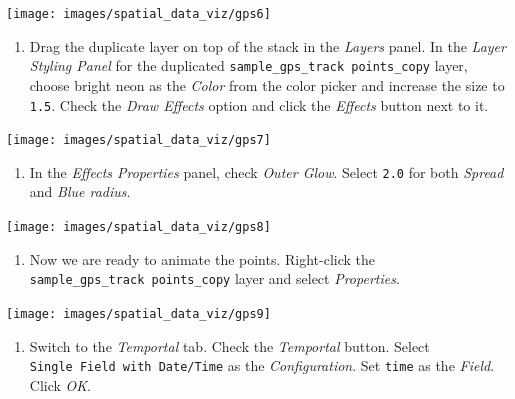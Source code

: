 \documentclass[
  12pt,
  a4paper]{article}
\providecommand{\tightlist}{%
  \setlength{\itemsep}{0pt}\setlength{\parskip}{0pt}}
\begin{document}
\begin{center}\texttt{[image: images/spatial\_data\_viz/gps6]} \end{center}

\begin{enumerate}
\def\labelenumi{\arabic{enumi}.}
\setcounter{enumi}{6}
\tightlist
\item
  Drag the duplicate layer on top of the stack in the \emph{Layers}
  panel. In the \emph{Layer Styling Panel} for the duplicated
  \texttt{sample\_gps\_track\ points\_copy} layer, choose bright neon as
  the \emph{Color} from the color picker and increase the size to
  \texttt{1.5}. Check the \emph{Draw Effects} option and click the
  \emph{Effects} button next to it.
\end{enumerate}

\begin{center}\texttt{[image: images/spatial\_data\_viz/gps7]} \end{center}

\begin{enumerate}
\def\labelenumi{\arabic{enumi}.}
\setcounter{enumi}{7}
\tightlist
\item
  In the \emph{Effects Properties} panel, check \emph{Outer Glow}.
  Select \texttt{2.0} for both \emph{Spread} and \emph{Blue radius}.
\end{enumerate}

\begin{center}\texttt{[image: images/spatial\_data\_viz/gps8]} \end{center}

\begin{enumerate}
\def\labelenumi{\arabic{enumi}.}
\setcounter{enumi}{8}
\tightlist
\item
  Now we are ready to animate the points. Right-click the
  \texttt{sample\_gps\_track\ points\_copy} layer and select
  \emph{Properties}.
\end{enumerate}

\begin{center}\texttt{[image: images/spatial\_data\_viz/gps9]} \end{center}

\begin{enumerate}
\def\labelenumi{\arabic{enumi}.}
\setcounter{enumi}{9}
\tightlist
\item
  Switch to the \emph{Temportal} tab. Check the \emph{Temportal} button.
  Select \texttt{Single\ Field\ with\ Date/Time} as the
  \emph{Configuration}. Set \texttt{time} as the \emph{Field}. Click
  \emph{OK}.
\end{enumerate}
\end{document}

